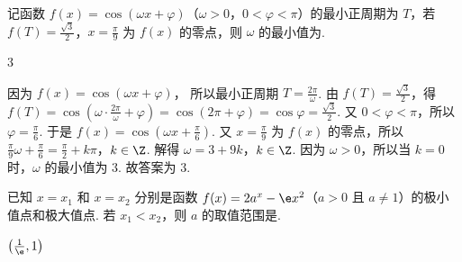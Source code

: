 \begin{problem}
记函数 \(f(x)=\cos \left( \omega x+\varphi \right)\)（\(\omega>0\)，\(0<\varphi<\pi\)）的最小正周期为 \(T\)，若 \(f(T)=\frac{\sqrt{3}}{2}\)，\(x=\frac{\pi}{9}\) 为 \(f(x)\) 的零点，则 \(\omega\) 的最小值为\fillinblank{}.
\end{problem}

\begin{answer}
3
\end{answer}

\begin{solution}
因为
\(f(x)=\cos \left( \omega x+\varphi \right)\)，
所以最小正周期
\(T=\frac{2\pi}{\omega}\).
由 \(f(T)=\frac{\sqrt{3}}{2}\)，得 \(f(T)=\cos \left( \omega\cdot \frac{2\pi}{\omega}+\varphi \right)=\cos \left( 2\pi+\varphi \right)=\cos \varphi=\frac{\sqrt{3}}{2}\).
又 \(0<\varphi<\pi\)，所以
\(\varphi=\frac{\pi}{6}\).
于是
\(f(x)=\cos \left( \omega x+\frac{\pi}{6} \right)\).
又 \(x=\frac{\pi}{9}\) 为 \(f(x)\) 的零点，所以
\(\frac{\pi}{9}\omega+\frac{\pi}{6}=\frac{\pi}{2}+k\pi\)，\(k\in \Z\).
解得
\(\omega=3+9k\)，\(k\in \Z\).
因为 \(\omega>0\)，所以当 \(k=0\) 时，\(\omega\) 的最小值为 \(3\).
故答案为 \(3\).
\end{solution}

\begin{problem}
已知 \(x=x_1\) 和 \(x=x_2\) 分别是函数 \(f(x)=2a^x-\e x^2\)（\(a>0\) 且 \(a\neq 1\)）的极小值点和极大值点. 若 \(x_1<x_2\)，则 \(a\) 的取值范围是\fillinblank{}.
\end{problem}

\begin{answer}
\(\left( \frac{1}{\e},1 \right)\)
\end{answer}

